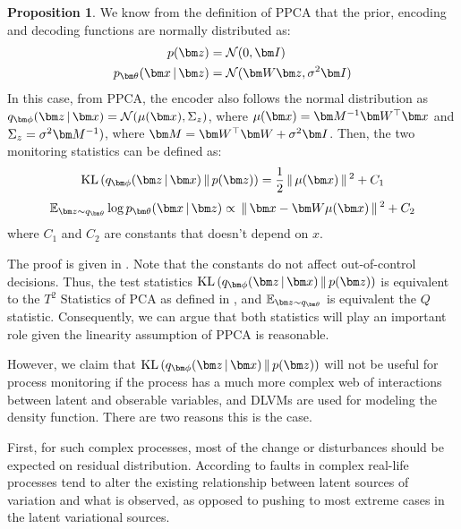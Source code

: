 \documentclass{scrartcl}
\theoremstyle{definition}
\newtheorem{prop}{Proposition}
\let\ref\Cref
\begin{document}
\begin{prop}
\label{prop: T2Q} 
We know from the definition of PPCA \parencite{tipping1999probabilistic} that the prior, encoding and decoding functions are normally distributed as:
\begin{equation*}
\begin{split}
p(\mbz)& = \Norm(0,\mbI)\\
\decoding &= \Norm(\mbW\mbz,\sigma^2 \mbI)  
\label{eq: Gaussian}
\end{split}
\end{equation*}
In this case, from PPCA, the encoder also follows the normal distribution as $\encoding =\Norm(\mu(\mbx),\Sigma_z)$, where $\mu(\mbx) = \mbM^{-1} \mbW^\top \mbx$ and  $\Sigma_z = \sigma^2\mbM^{-1})$, where $\mbM = \mbW^\top \mbW + \sigma^2 \mbI$.
Then, the two monitoring statistics can be defined as: 
\begin{equation}
    \label{eqn:KL_PPCA}
	\KL{\encoding}{p(\mbz)} = \frac{1}{2} \gg \mu(\mbx) \gg^2 + C_1
\end{equation}
\begin{equation}
    \label{eqn:E_PPCA}
	\E_{\mbz \sim q_{\mbtheta}} \log \decoding \propto \gg\mbx-\mbW \mu(\mbx) \gg^{2} + C_2
\end{equation}
where $C_1$ and $C_2$ are constants that doesn't depend on $x$.
\end{prop}
The proof is given in \ref{sec:PoofOfPropTQ}. 
Note that the constants do not affect out-of-control decisions. 
Thus, the test statistics $\KL{\encoding}{p(\mbz)}$ is equivalent to the $T^{2}$ Statistics of PCA as defined in \ref{eqn: QTPCA}, and $\E_{\mbz \sim q_{\mbtheta}}$ is equivalent the $Q$ statistic.
Consequently, we can argue that both statistics will play an important role given the linearity assumption of PPCA is reasonable.

However, we claim that $\KL{\encoding}{p(\mbz)}$ will not be useful for process monitoring if the process has a much more complex web of interactions between latent and obserable variables, and DLVMs are used for modeling the density function.
There are two reasons this is the case.

First, for such complex processes, most of the change or disturbances should be expected on residual distribution. 
According to \parencite{severson2016perspectives} faults in complex real-life processes tend to alter the existing relationship between latent sources of variation and what is observed, as opposed to pushing to most extreme cases in the latent variational sources.
\end{document}

